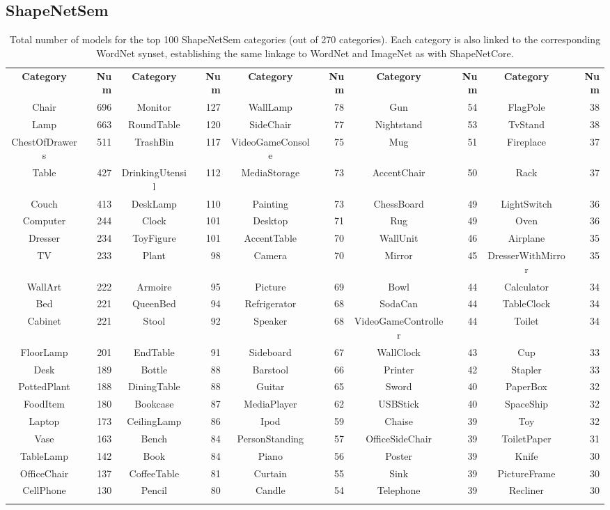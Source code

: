 \subsection{ShapeNetSem}
\label{sec:shapenetsem}

\begin{table*}
\centering\footnotesize
\begin{tabular}{cr|cr|cr|cr|cr}
	\hline
\textbf{Category}&\textbf{Num}&\textbf{Category}&\textbf{Num}&\textbf{Category}&\textbf{Num}&\textbf{Category}&\textbf{Num}&\textbf{Category}&\textbf{Num}\\
Chair&696&Monitor&127&WallLamp&78&Gun&54&FlagPole&38\\
Lamp&663&RoundTable&120&SideChair&77&Nightstand&53&TvStand&38\\
ChestOfDrawers&511&TrashBin&117&VideoGameConsole&75&Mug&51&Fireplace&37\\
Table&427&DrinkingUtensil&112&MediaStorage&73&AccentChair&50&Rack&37\\
Couch&413&DeskLamp&110&Painting&73&ChessBoard&49&LightSwitch&36\\
Computer&244&Clock&101&Desktop&71&Rug&49&Oven&36\\
Dresser&234&ToyFigure&101&AccentTable&70&WallUnit&46&Airplane&35\\
TV&233&Plant&98&Camera&70&Mirror&45&DresserWithMirror&35\\
WallArt&222&Armoire&95&Picture&69&Bowl&44&Calculator&34\\
Bed&221&QueenBed&94&Refrigerator&68&SodaCan&44&TableClock&34\\
Cabinet&221&Stool&92&Speaker&68&VideoGameController&44&Toilet&34\\
FloorLamp&201&EndTable&91&Sideboard&67&WallClock&43&Cup&33\\
Desk&189&Bottle&88&Barstool&66&Printer&42&Stapler&33\\
PottedPlant&188&DiningTable&88&Guitar&65&Sword&40&PaperBox&32\\
FoodItem&180&Bookcase&87&MediaPlayer&62&USBStick&40&SpaceShip&32\\
Laptop&173&CeilingLamp&86&Ipod&59&Chaise&39&Toy&32\\
Vase&163&Bench&84&PersonStanding&57&OfficeSideChair&39&ToiletPaper&31\\
TableLamp&142&Book&84&Piano&56&Poster&39&Knife&30\\
OfficeChair&137&CoffeeTable&81&Curtain&55&Sink&39&PictureFrame&30\\
CellPhone&130&Pencil&80&Candle&54&Telephone&39&Recliner&30\\
	\hline\\
\end{tabular}
\caption{\small{Total number of models for the top 100 ShapeNetSem categories (out of 270 categories). Each category is also linked to the corresponding WordNet synset, establishing the same linkage to WordNet and ImageNet as with ShapeNetCore.}}
\label{tab:shapenetsem}
\end{table*}

